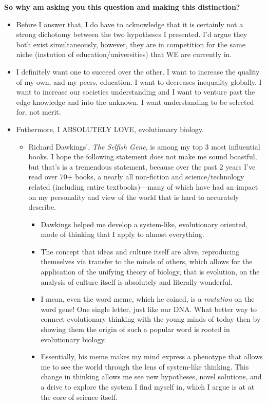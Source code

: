 \documentclass[12pt,a4paper]{article}
\begin{document}
\newpage
\textbf{So why am asking you this question and making this distinction?}
    \begin{itemize}
        \item Before I answer that, I do have to acknowledge that it is certainly not a strong dichotomy between the two hypotheses I presented. I'd argue they both exist simultaneously, however, they are in competition for the same niche (instution of education/universities) that WE are currently in.
        \item I definitely want one to succeed over the other. I want to increase the quality of my own, and my peers, education. I want to decreases inequality globally. I want to increase our societies understanding and I want to venture past the edge knowledge and into the unknown. I want understanding to be selected for, not merit. 
        \item Futhermore, I ABSOLUTELY LOVE, evolutionary biology.
            \begin{itemize}
                \item Richard Dawkings', \textit{The Selfish Gene}, is among my top 3 most influential books. I hope the following statement does not make me sound boastful, but that's is a tremendous statement, because over the past 2 years I've read over 70+ books, a nearly all non-fiction and science/technology related (including entire textbooks)---many of which have had an impact on my personality and view of the world that is hard to accurately describe.
                    \begin{itemize}
                        \item Dawkings helped me develop a system-like, evolutionary oriented, mode of thinking that I apply to almost everything. 
                        \item The concept that ideas and culture itself are alive, reproducing themselves via transfer to the minds of others, which allows for the application of the unifying theory of biology, that is evolution, on the analysis of culture itself is absolutely and literally wonderful.
                        \item I mean, even the word meme, which he coined, is a \textit{mutation} on the word gene! One single letter, just like our DNA. What better way to connect evolutionary thinking with the young minds of today then by showing them the origin of such a popular word is rooted in evolutionary biology. %
                        \item Essentially, his meme makes my mind express a phenotype that allows me to see the world through the lens of system-like thinking. This change in thinking allows me see new hypotheses, novel solutions, and a drive to explore the system I find myself in, which I argue is at at the core of science itself.

\end{itemize}
\end{itemize}
\end{itemize}
\end{document}
